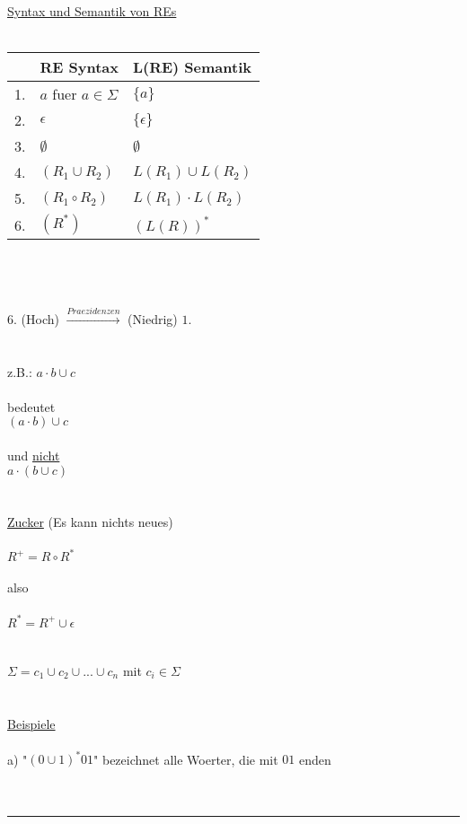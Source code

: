 \documentclass[18pt,a4paper]{scrreprt}
\begin{document}
\uline{Syntax und Semantik von REs}\\
\\
\begin{tabular}{ r | l | l }                       
   & RE Syntax & L(RE) Semantik \\
  \hline
  1. & $a$ fuer $a \in \Sigma$ & $\{a\}$ \\
  2. & $\epsilon$ & $\{\epsilon\}$ \\
  3. & $\emptyset$ & $\emptyset$ \\
  4. & $(R_1 \cup R_2)$ & $L(R_1) \cup L(R_2)$ \\
  5. & $(R_1 \circ R_2)$ & $L(R_1) \cdot L(R_2)$ \\
  6. & $(R^*)$ & $(L(R))^*$ \\
\end{tabular}
\\
\\
\\
$6.$ (Hoch) $\xrightarrow{Praezidenzen}$ (Niedrig) $1.$\\
\\
\\
z.B.: $a \cdot b \cup c$\\
\\
bedeutet\\
$(a \cdot b) \cup c$\\
\\
und \uline{nicht}\\
$a \cdot (b \cup c)$\\
\\
\\
\uline{Zucker} (Es kann nichts neues)\\
\\
$R^+ = R \circ R^*$\\
\\
also\\
\\
$R^* = R^+ \cup \epsilon$\\
\\
\\
$\Sigma = c_1 \cup c_2 \cup ... \cup c_n$ mit $c_i \in \Sigma$\\
\\
\\
\uline{Beispiele}\\
\\
a) "$(0 \cup 1)^* 0 1$" bezeichnet alle Woerter, die mit $01$ enden\\
\\
\\
\rule{\textwidth}{0.4mm}\\
\\
\end{document}
